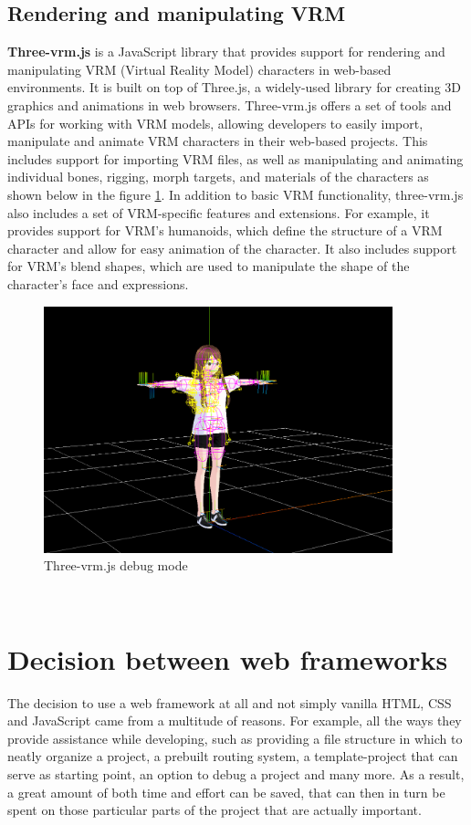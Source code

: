 \subsection{Rendering and manipulating VRM}
\textbf{Three-vrm.js} is a JavaScript library that provides support for rendering 
and manipulating VRM (Virtual Reality Model) characters in web-based environments. 
It is built on top of Three.js, a widely-used library for creating 3D graphics and 
animations in web browsers.
Three-vrm.js offers a set of tools and APIs for working with VRM models, allowing 
developers to easily import, manipulate and animate VRM characters in their web-based 
projects. This includes support for importing VRM files, as well as manipulating and animating 
individual bones, rigging, morph targets, and materials of the characters as shown below in the figure \ref{fig:threevrmdebug}.
In addition to basic VRM functionality, three-vrm.js also includes a set of VRM-specific 
features and extensions. For example, it provides support for VRM's humanoids, which define 
the structure of a VRM character and allow for easy animation of the character. It also includes 
support for VRM's blend shapes, which are used to manipulate the shape of the character's 
face and expressions.
\\
\begin{figure}[htb]
    \centering
    \includegraphics[width=0.9\textwidth]{pics/threevrmdebug.PNG}
    \caption{Three-vrm.js debug mode}
    \label{fig:threevrmdebug}
\end{figure}
\\
\section{Decision between web frameworks}
The decision to use a web framework at all and not simply vanilla HTML, CSS and JavaScript came from a multitude of reasons.
For example, all the ways they provide assistance while developing, such as providing a file structure in which to neatly 
organize a project, a prebuilt routing system, a template-project that can serve as starting point, an option to debug a 
project and many more. As a result, a great amount of both time and effort can be saved, that can then in turn be spent on 
those particular parts of the project that are actually important.

